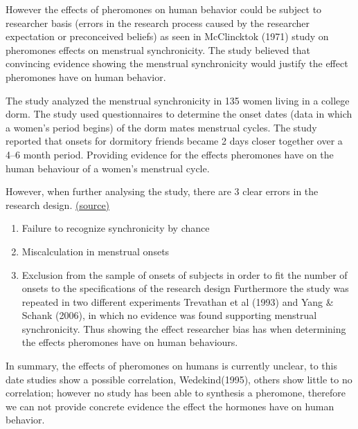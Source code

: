 \documentclass{article}
\begin{document}
However the effects of pheromones on human behavior could be subject to researcher basis (errors in the research process caused by the researcher expectation or preconceived beliefs) as seen in McClincktok (1971) study on pheromones effects on menstrual synchronicity. The study believed that convincing evidence showing the menstrual synchronicity would justify the effect pheromones have on human behavior.

The study analyzed the menstrual synchronicity in 135 women living in a college dorm. The study used questionnaires to determine the onset dates (data in which a women's period begins) of the dorm mates menstrual cycles. The study reported that onsets for dormitory friends became 2 days closer together over a 4–6 month period. Providing evidence for the effects pheromones have on the human behaviour of a women's menstrual cycle.

However, when further analysing the study, there are 3 clear errors in the research design. \href{https://labs.psych.ucsb.edu/roney/james/other%20pdf%20readings/Wison%25201992%2520Critical%2520Reveiw%2520of%2520Menstrual%2520Synchrony.pdf}{(source)}

\begin{enumerate}
    \item Failure to recognize synchronicity by chance
    \item Miscalculation in menstrual onsets
    \item Exclusion from the sample of onsets of subjects in order to fit the number of onsets to the specifications of the research design
   Furthermore the study was repeated in two different experiments Trevathan et al (1993) and Yang & Schank (2006), in which no evidence was found supporting menstrual synchronicity. Thus showing the effect researcher bias has when determining the effects pheromones have on human behaviours.
\end{enumerate}

In summary, the effects of pheromones on humans is currently unclear, to this date studies show a possible correlation, Wedekind(1995), others show little to no correlation; however no study has been able to synthesis a pheromone, therefore we can not provide concrete evidence the effect the hormones have on human behavior.
\end{document}
